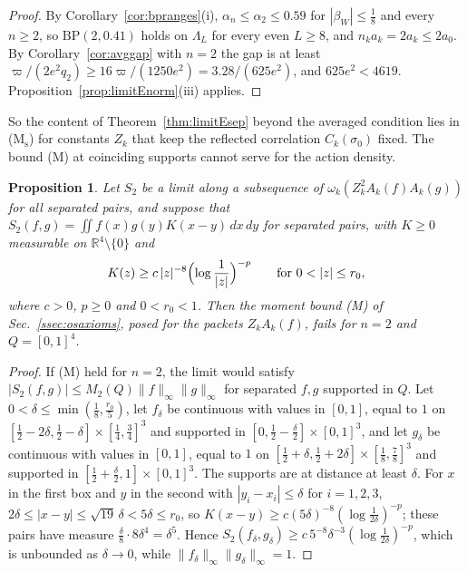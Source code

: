\documentclass[aps,prd,twocolumn,superscriptaddress,nofootinbib,longbibliography,floatfix,amsmath,amssymb,10pt]{revtex4-2}
\newtheorem{proposition}[theorem]{Proposition}
\theoremstyle{definition}
\theoremstyle{remark}
\newcommand{\R}{\mathbb{R}}
\begin{document}
\begin{proof}
By Corollary~\ref{cor:bpranges}(i), $\alpha_n\le\alpha_2\le0.59$ for
$|\beta_W|\le\frac18$ and every $n\ge2$, so $\mathrm{BP}(2,0.41)$ holds on
$\Lambda_L$ for every even $L\ge8$, and $n_ka_k=2a_k\le2a_0$. By
Corollary~\ref{cor:avggap} with $n=2$ the gap is at least $\varpi/(2e^2q_2)
\ge16\varpi/(1250e^2)=3.28/(625e^2)$, and $625e^2<4619$.
Proposition~\ref{prop:limitEnorm}(iii) applies.
\end{proof}

So the content of Theorem~\ref{thm:limitEsep} beyond the averaged
condition lies in (M$_{\mathrm s}$) for constants $Z_k$ that keep the
reflected correlation $C_k(\sigma_0)$ fixed. The bound (M) at
coinciding supports cannot serve for the action density.

\begin{proposition}\label{prop:limitEsing}
Let $S_2$ be a limit along a subsequence of $\omega_k(Z_k^2A_k(f)A_k(g))$
for all separated pairs, and suppose that $S_2(f,g)=\iint f(x)g(y)K(x-y)\,dx
\,dy$ for separated pairs, with $K\ge0$ measurable on $\R^4\setminus\{0\}$
and
\[
K(z)\ge c\,|z|^{-8}\Bigl(\log\frac1{|z|}\Bigr)^{-p}\qquad\text{for }0<|z|
\le r_0,
\]
where $c>0$, $p\ge0$ and $0<r_0<1$. Then the moment bound \textup{(M)} of
Sec.~\textup{\ref{ssec:osaxioms}}, posed for the packets $Z_kA_k(f)$, fails
for $n=2$ and $Q=[0,1]^4$.
\end{proposition}

\begin{proof}
If (M) held for $n=2$, the limit would satisfy $|S_2(f,g)|\le M_2(Q)\|f\|
_\infty\|g\|_\infty$ for separated $f,g$ supported in $Q$. Let $0<\delta\le
\min(\frac18,\frac{r_0}5)$, let $f_\delta$ be continuous with values in
$[0,1]$, equal to $1$ on $[\frac12-2\delta,\frac12-\delta]\times[\frac14,
\frac34]^3$ and supported in $[0,\frac12-\frac\delta2]\times[0,1]^3$, and let
$g_\delta$ be continuous with values in $[0,1]$, equal to $1$ on
$[\frac12+\delta,\frac12+2\delta]\times[\frac18,\frac78]^3$ and supported in
$[\frac12+\frac\delta2,1]\times[0,1]^3$. The supports are at distance at
least $\delta$. For $x$ in the first box and $y$ in the second with
$|y_i-x_i|\le\delta$ for $i=1,2,3$, $2\delta\le|x-y|\le\sqrt{19}\,\delta<
5\delta\le r_0$, so $K(x-y)\ge c(5\delta)^{-8}(\log\frac1{2\delta})^{-p}$;
these pairs have measure $\frac\delta8\cdot8\delta^4=\delta^5$. Hence
$S_2(f_\delta,g_\delta)\ge c\,5^{-8}\delta^{-3}(\log\frac1{2\delta})^{-p}$,
which is unbounded as $\delta\to0$, while $\|f_\delta\|_\infty\|g_\delta\|
_\infty=1$.
\end{proof}
\end{document}
